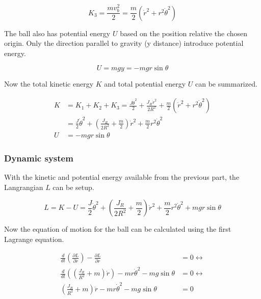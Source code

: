 \documentclass[a4paper, titlepage]{article}
\begin{document}
\begin{equation}
K_3 = \frac{mv_b^2}{2} = \frac{m}{2}(\dot{r}^2 + r^2\dot{\theta}^2)
\end{equation}

The ball also has potential energy $U$ based on the position relative the chosen origin.
Only the direction parallel to gravity (y distance) introduce potential energy.

\begin{equation}
U = mgy = -mgr\sin{\theta}
\end{equation}

Now the total kinetic energy $K$ and total potential energy $U$ can be summarized.

\begin{equation}
\begin{split}
K &= K_1 + K_2 + K_3 = 
\frac{J\dot{\theta}^2}{2} + 
\frac{J_R\dot{r}^2}{2R^2} + 
\frac{m}{2}(\dot{r}^2 + r^2\dot{\theta}^2) \\
&= \frac{J}{2}\dot{\theta}^2 + 
(\frac{J_R}{2R^2} + \frac{m}{2})\dot{r}^2 + 
\frac{m}{2}r^2\dot{\theta}^2 \\
U &= -mgr\sin{\theta}
\end{split}
\end{equation}

\subsubsection{Dynamic system}
With the kinetic and potential energy available from the previous part, the Langrangian $L$ can be setup.

\begin{equation}
L = K - U = 
\frac{J}{2}\dot{\theta}^2 + 
(\frac{J_R}{2R^2} + \frac{m}{2})\dot{r}^2 + 
\frac{m}{2}r^2\dot{\theta}^2 +
mgr\sin{\theta}
\end{equation}

Now the equation of motion for the ball can be calculated using the first Lagrange equation.

\begin{equation}
\begin{split}
\frac{d}{dt}\left(\frac{\partial L}{\partial \dot{r}}\right) - \frac{\partial L}{\partial r} &= 0 \leftrightarrow \\
\frac{d}{dt}\left(\left(\frac{J_R}{R^2} + m\right)\dot{r}\right) - mr\dot{\theta}^2 - mg\sin{\theta} &= 0 \leftrightarrow \\
\left(\frac{J_R}{R^2} + m\right)\ddot{r} - mr\dot{\theta}^2 - mg\sin{\theta} &= 0
\label{equ:ballDiff}
\end{split}
\end{equation}
\end{document}
